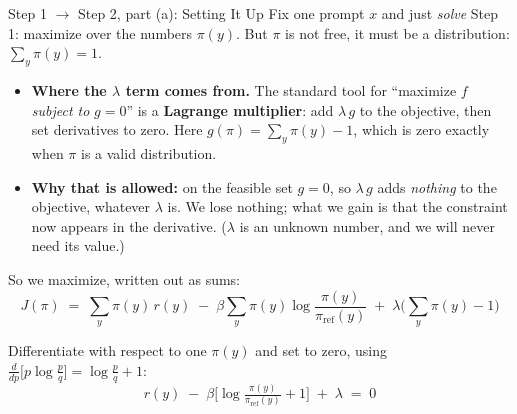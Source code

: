 \begin{frame}{Step 1 $\rightarrow$ Step 2, part (a): Setting It Up}
Fix one prompt $x$ and just \emph{solve} Step 1: maximize over the numbers
$\pi(y)$. But $\pi$ is not free, it must be a distribution: $\sum_y \pi(y) = 1$.
\vspace{0.4em}
\begin{itemize}\itemsep0.25em\small
    \item \textbf{Where the $\lambda$ term comes from.} The standard tool for
          ``maximize $f$ \emph{subject to} $g=0$'' is a \textbf{Lagrange multiplier}:
          add $\lambda\, g$ to the objective, then set derivatives to zero. Here
          $g(\pi) = \sum_y \pi(y) - 1$, which is zero exactly when $\pi$ is a valid
          distribution.
    \item \textbf{Why that is allowed:} on the feasible set $g=0$, so
          $\lambda\,g$ adds \emph{nothing} to the objective, whatever $\lambda$ is.
          We lose nothing; what we gain is that the constraint now appears in the
          derivative. ($\lambda$ is an unknown number, and we will never need its
          value.)
\end{itemize}
\vspace{0.3em}
So we maximize, written out as sums:
\vspace{-0.2em}
\[
    J(\pi) \;=\; \sum_y \pi(y)\, r(y)
    \;-\; \beta \sum_y \pi(y)\log\frac{\pi(y)}{\pi_{\text{ref}}(y)}
    \;+\; \lambda\Big(\sum_y \pi(y) - 1\Big)
\]
\vspace{-0.6em}

Differentiate with respect to one $\pi(y)$ and set to zero, using
$\frac{d}{dp}\big[p\log\frac{p}{q}\big] = \log\frac{p}{q} + 1$:
\vspace{-0.3em}
\[
    r(y) \;-\; \beta\Big[\log\tfrac{\pi(y)}{\pi_{\text{ref}}(y)} + 1\Big] \;+\; \lambda
    \;=\; 0
\]
\end{frame}

